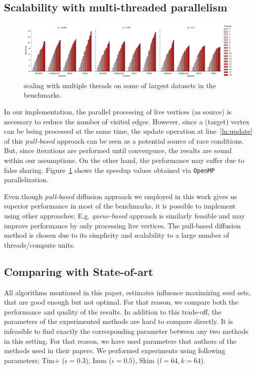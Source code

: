 \documentclass[10pt,journal,compsoc]{IEEEtran}
\newcommand\acro{{\sc{HyperFuseR\xspace}\xspace}\xspace}
\begin{document}
\subsection{Scalability with multi-threaded parallelism}

\begin{figure}[!ht] 
    \centering
    \includegraphics[width=\linewidth]{images/threads.pdf}
   \centering \caption{\acro scaling with multiple threads on some of largest datasets in the benchmarks.
     \label{fig:scaling}} 
\end{figure}


In our implementation, the parallel processing of live vertices  (as source) is necessary to reduce the number of visited edges. However, since a (target) vertex can be being processed at the same time, the update operation at line~\ref {ln:update} of this {\em pull-based} approach can be seen as a potential source of race conditions. But, since iterations are performed until convergence, the results are sound within our assumptions. On the other hand, the performance may suffer due to false sharing.
Figure~\ref{fig:scaling} shows the speedup values obtained via {\tt OpenMP} parallelization.

Even though {\em pull-based} diffusion approach we employed in this work gives us superior performance in most of the benchmarks, it is possible to implement \acro using other approaches; E.g. {\em queue-based} approach is similarly feasible and may improve performance by only processing live vertices. The pull-based diffusion method is chosen due to its simplicity and scalability to a large number of threads/compute units. 

\subsection{Comparing \acro with State-of-art}
All algorithms mentioned in this paper, estimates influence maximizing seed sets, that are good enough but not optimal. For that reason, we compare both the performance and quality of the results. In addition to this trade-off, the parameters of the experimented methods are hard to compare directly. It is infeasible to find exactly the corresponding parameter between any two methods in this setting. For that reason, we have used parameters that authors of the methods used in their papers.
We performed experiments using following parameters; {\sc Tim+} ($\epsilon=0.3$), {\sc Imm} ($\epsilon=0.5$), {\sc Skim} ($l=64,k=64$). 
\end{document}
